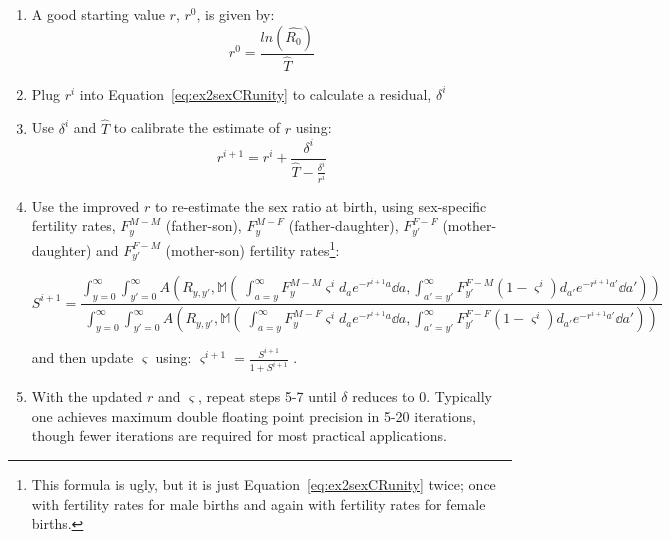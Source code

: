 \begin{enumerate}
  \item A good starting value $r$, $r^0$, is given by:
   \begin{equation}
   r^0 = \frac{ln(\widehat{R_0})}{\widehat{T}}
   \end{equation}
  \item Plug $r^i$ into Equation~\ref{eq:ex2sexCRunity} to calculate a
  residual, $\delta^i$
  \item Use $\delta^i$ and $\widehat{T}$ to calibrate the estimate of $r$
  using:
  \begin{equation}
  r^{i+1} = r^i + \frac{\delta^i}{\widehat{T} - \frac{\delta^i}{r^i}}
  \end{equation}
  \item Use the improved $r$ to re-estimate the sex ratio at birth, using
  sex-specific fertility rates, $F_y^{M-M}$ (father-son), $F_y^{M-F}$
  (father-daughter), $F_{y'}^{F-F}$ (mother-daughter) and $F_{y'}^{F-M}$
  (mother-son) fertility rates\footnote{This formula is ugly, but it is just
  Equation~\eqref{eq:ex2sexCRunity} twice; once with fertility rates for male
  births and again with fertility rates for female births.}:
  \begin{adjustwidth}{-1in}{0in}
  \begin{equation}
  S^{i+1} = \frac{\int_{y=0}^\infty \int_{y'=0}^\infty
A\left(R_{y,y'},\mathbb{M}\left(\;\int_{a=y}^\infty F_y^{M-M} \varsigma^i
d_ae^{-r^{i+1}a} \dd a, \int _{a'=y'}^\infty F_{y'}^{F-M} (1-\varsigma^i)
d_{a'}e^{-r^{i+1}a'} \dd a'\right)\right)}{\int_{y=0}^\infty \int_{y'=0}^\infty
A\left(R_{y,y'}, \mathbb{M}\left(\;\int_{a=y}^\infty F_y^{M-F} \varsigma^i d_a
e^{-r^{i+1}a} \dd a, \int _{a'=y'}^\infty F_{y'}^{F-F} (1-\varsigma^i)
d_{a'}e^{-r^{i+1}a'} \dd a'\right)\right)}
  \end{equation}
  \end{adjustwidth}
  and then update $\varsigma$ using: $\varsigma^{i+1} =
  \frac{S^{i+1}}{1+S^{i+1}}$ .
  \item With the updated $r$ and $\varsigma$, repeat steps 5-7 until $\delta$
  reduces to 0. Typically one achieves maximum double floating point precision
  in 5-20 iterations, though fewer iterations are required for
  most practical applications.
\end{enumerate}












